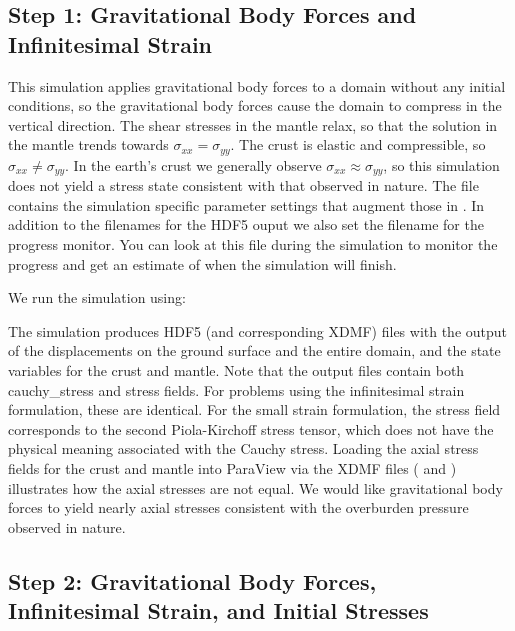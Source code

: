 \subsection{Step 1: Gravitational Body Forces and Infinitesimal Strain}

This simulation applies gravitational body forces to a domain without
any initial conditions, so the gravitational body forces cause the
domain to compress in the vertical direction. The shear stresses in
the mantle relax, so that the solution in the mantle trends towards
$\sigma_{xx}=\sigma_{yy}$. The crust is elastic and compressible, so
$\sigma_{xx}\neq\sigma_{\mathit{yy}}$. In the earth's crust we
generally observe $\sigma_{\mathit{xx}}\approx\sigma_{\mathit{yy}}$,
so this simulation does not yield a stress state consistent with that
observed in nature. The file 
contains the simulation specific parameter settings that augment those
in .  In addition to the filenames for the
HDF5 ouput we also set the filename for the progress monitor. You can
look at this file during the simulation to monitor the progress and
get an estimate of when the simulation will finish.

We run the simulation using:
The simulation produces HDF5 (and corresponding XDMF) files with the
output of the displacements on the ground surface and the entire
domain, and the state variables for the crust and mantle. Note that
the output files contain both cauchy\_stress and stress fields. For
problems using the infinitesimal strain formulation, these are
identical. For the small strain formulation, the stress field
corresponds to the second Piola-Kirchoff stress tensor, which does not
have the physical meaning associated with the Cauchy stress. Loading
the axial stress fields for the crust and mantle into ParaView via the
XDMF files ( and
) illustrates how the
axial stresses are not equal. We would like gravitational body forces
to yield nearly axial stresses consistent with the overburden pressure
observed in nature.


\subsection{Step 2: Gravitational Body Forces, Infinitesimal Strain, and Initial Stresses}

